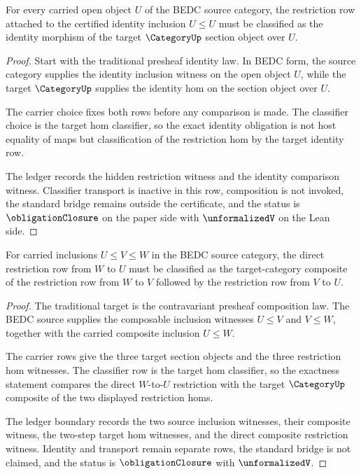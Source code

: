 \begin{theorem}\label{thm:presheaf-restriction-identity-row}
For every carried open object $U$ of the BEDC source category, the restriction row attached to the certified identity inclusion $U\le U$ must be classified as the identity morphism of the target $\CategoryUp$ section object over $U$.
\end{theorem}
\begin{proof}
Start with the traditional presheaf identity law. In BEDC form, the source category supplies the identity inclusion witness on the open object $U$, while the target $\CategoryUp$ supplies the identity hom on the section object over $U$.

The carrier choice fixes both rows before any comparison is made. The classifier choice is the target hom classifier, so the exact identity obligation is not host equality of maps but classification of the restriction hom by the target identity row.

The ledger records the hidden restriction witness and the identity comparison witness. Classifier transport is inactive in this row, composition is not invoked, the standard bridge remains outside the certificate, and the status is $\obligationClosure$ on the paper side with $\unformalizedV$ on the Lean side.
\end{proof}

\begin{theorem}\label{thm:presheaf-restriction-composition-row}
For carried inclusions $U\le V\le W$ in the BEDC source category, the direct restriction row from $W$ to $U$ must be classified as the target-category composite of the restriction row from $W$ to $V$ followed by the restriction row from $V$ to $U$.
\end{theorem}
\begin{proof}
The traditional target is the contravariant presheaf composition law. The BEDC source supplies the composable inclusion witnesses $U\le V$ and $V\le W$, together with the carried composite inclusion $U\le W$.

The carrier rows give the three target section objects and the three restriction hom witnesses. The classifier row is the target hom classifier, so the exactness statement compares the direct $W$-to-$U$ restriction with the target $\CategoryUp$ composite of the two displayed restriction homs.

The ledger boundary records the two source inclusion witnesses, their composite witness, the two-step target hom witnesses, and the direct composite restriction witness. Identity and transport remain separate rows, the standard bridge is not claimed, and the status is $\obligationClosure$ with $\unformalizedV$.
\end{proof}

